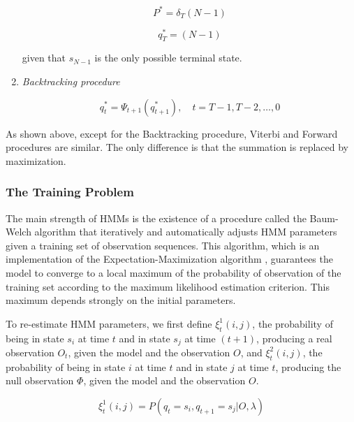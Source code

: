 \documentclass{article}[14pt, oneside, a4paper, times]
\begin{document}
\begin{enumerate}
\begin{equation}
    P^* = \delta_T(N-1)
    \label{EQ:delta-termination-1}
\end{equation}

\begin{equation}
    q_T^* = (N-1)
    \label{EQ:delta-termination-2}
\end{equation}

\noindent given that $s_{N-1}$ is the only possible terminal state.

\item \textit{Backtracking procedure}

\begin{equation}
    q_t^* = \Psi_{t+1} (q_{t+1}^*), \quad t=T-1, T-2, \ldots, 0
    \label{EQ:backtracking-procedure}
\end{equation}
\end{enumerate}

As shown above, except for the Backtracking procedure, Viterbi and Forward
procedures are similar. The only difference is that the summation is replaced
by maximization.


\subsubsection{The Training Problem}
\label{AP:the-training-problem}

The main strength of HMMs is the existence of a procedure called the Baum-Welch
algorithm \cite{Jelinek97,Rabiner89} that iteratively and automatically adjusts
HMM parameters given a training set of observation sequences. This algorithm,
which is an implementation of the Expectation-Maximization algorithm
\cite{Moom96}, guarantees the model to converge to a local maximum of the
probability of observation of the training set according to the maximum
likelihood estimation criterion. This maximum depends strongly on the initial
parameters.

To re-estimate HMM parameters, we first define $\xi_t^1(i,j)$, the probability
of being in state $s_i$ at time $t$ and in state $s_j$ at time $(t+1)$,
producing a real observation $O_t$, given the model and the observation $O$,
and $\xi_t^2(i,j)$, the probability of being in state $i$ at time $t$ and in
state $j$ at time $t$, producing the null observation $\Phi$, given the model
and the observation $O$.

\begin{equation}
    \xi_t^1(i,j) = P(q_t = s_i, q_{t+1} = s_j | O, \lambda)
    \label{EQ:xi-1}
\end{equation}
\end{document}
